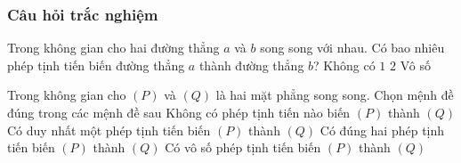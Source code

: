\subsubsection{Câu hỏi trắc nghiệm}
\begin{ex}%
	Trong không gian cho hai đường thẳng $a$ và $b$ song song với nhau. Có bao nhiêu phép tịnh tiến biến đường thẳng $a$ thành đường thẳng $b$?
	\choice
	{Không có}
	{$1$}
	{$2$}
	{\True Vô số}
\end{ex}
\begin{ex}%
	Trong không gian cho $(P)$ và $(Q)$ là hai mặt phẳng song song. Chọn mệnh đề đúng trong các mệnh đề sau
	\choice
	{Không có phép tịnh tiến nào biến $(P)$ thành $(Q)$}
	{Có duy nhất một phép tịnh tiến biến $(P)$ thành $(Q)$}
	{Có đúng hai phép tịnh tiến biến $(P)$ thành $(Q)$}
	{\True Có vô số phép tịnh tiến biến $(P)$ thành $(Q)$}
\end{ex}
